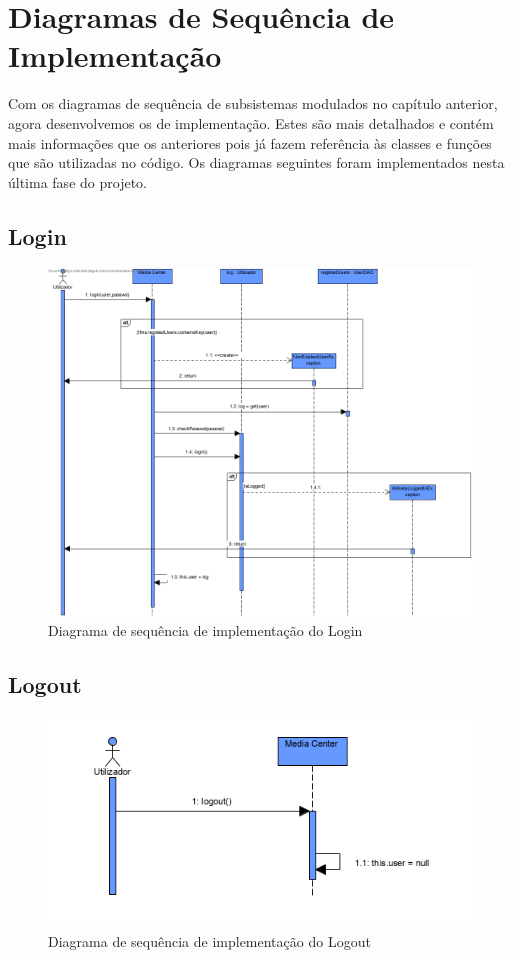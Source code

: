 \documentclass[a4paper]{report}
\begin{document}
\chapter{Diagramas de Sequência de Implementação}
Com os diagramas de sequência de subsistemas modulados no capítulo anterior,
agora desenvolvemos os de implementação. Estes são mais detalhados e contém
mais informações que os anteriores pois já fazem referência às classes e
funções que são utilizadas no código. Os diagramas seguintes foram implementados
nesta última fase do projeto.

\section{Login}
\begin{figure}[H]
	\centering 
    \includegraphics[width=\textwidth]{images/loginImp.png}  
    \caption{Diagrama de sequência de implementação do Login}
\end{figure}

\section{Logout}
\begin{figure}[H]
	\centering 
    \includegraphics[width=\textwidth]{images/logoutImp.png}  
    \caption{Diagrama de sequência de implementação do Logout}
\end{figure}
\end{document}

